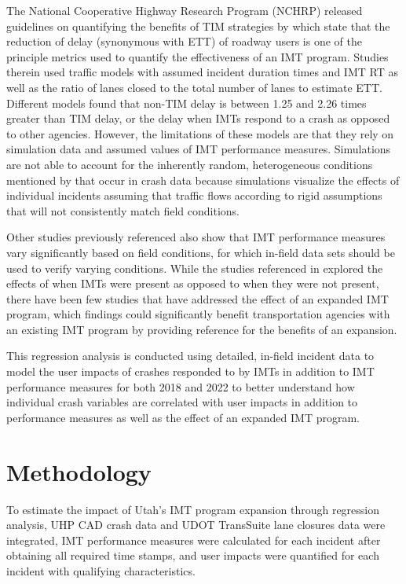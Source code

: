 \documentclass[
  letterpaper,
  authoryear]{elsarticle}
\begin{document}
The National Cooperative Highway Research Program (NCHRP) released
guidelines on quantifying the benefits of TIM strategies by
\citet{shah_development_2022} which state that the reduction of delay
(synonymous with ETT) of roadway users is one of the principle metrics
used to quantify the effectiveness of an IMT program. Studies therein
used traffic models with assumed incident duration times and IMT RT as
well as the ratio of lanes closed to the total number of lanes to
estimate ETT. Different models found that non-TIM delay is between 1.25
and 2.26 times greater than TIM delay, or the delay when IMTs respond to
a crash as opposed to other agencies. However, the limitations of these
models are that they rely on simulation data and assumed values of IMT
performance measures. Simulations are not able to account for the
inherently random, heterogeneous conditions mentioned by
\citet{wali_heterogeneity_2022} that occur in crash data because
simulations visualize the effects of individual incidents assuming that
traffic flows according to rigid assumptions that will not consistently
match field conditions.

Other studies previously referenced also show that IMT performance
measures vary significantly based on field conditions, for which
in-field data sets should be used to verify varying conditions. While
the studies referenced in \citet{shah_development_2022} explored the
effects of when IMTs were present as opposed to when they were not
present, there have been few studies that have addressed the effect of
an expanded IMT program, which findings could significantly benefit
transportation agencies with an existing IMT program by providing
reference for the benefits of an expansion.

This regression analysis is conducted using detailed, in-field incident
data to model the user impacts of crashes responded to by IMTs in
addition to IMT performance measures for both 2018 and 2022 to better
understand how individual crash variables are correlated with user
impacts in addition to performance measures as well as the effect of an
expanded IMT program.


\section{Methodology}\label{methodology}

To estimate the impact of Utah's IMT program expansion through
regression analysis, UHP CAD crash data and UDOT TransSuite lane
closures data were integrated, IMT performance measures were calculated
for each incident after obtaining all required time stamps, and user
impacts were quantified for each incident with qualifying
characteristics.
\end{document}

